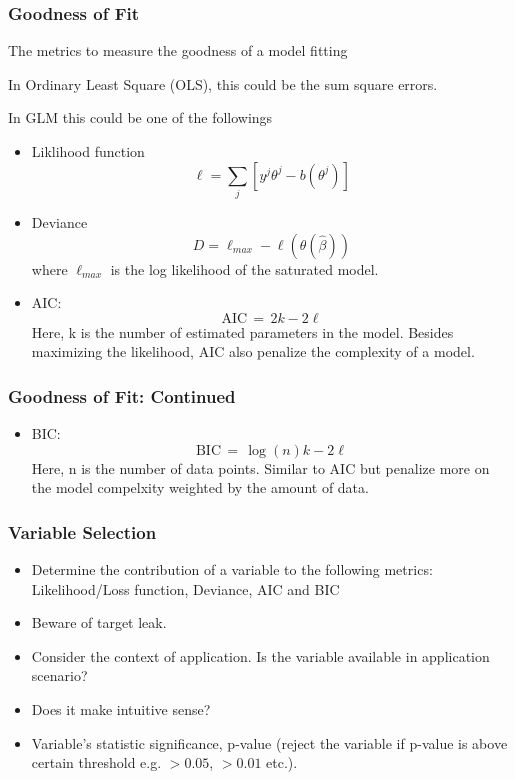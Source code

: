 \documentclass[notheorems, aspectratio=54, tikz,border=10pt,multi]{beamer}
\begin{document}
\begin{frame}
\frametitle{Goodness of Fit}

The metrics to measure the goodness of a model fitting

In Ordinary Least Square (OLS), this could be the sum square errors.

In GLM this could be one of the followings
\begin{itemize}
\item Liklihood function$$\ell=\sum_{j} \left[y^j\theta^j-b(\theta^j)\right]$$

\item Deviance $$D=\ell_{max}-\ell(\theta (\hat{\beta}))$$ where $\ell_{max}$ is the log likelihood of the saturated model.

\item AIC: $${\displaystyle \mathrm {AIC} \,=\,2k-2\ell}$$
Here, k is the number of estimated parameters in the model. Besides maximizing the likelihood, AIC also penalize the complexity of a model.

\end{itemize}
\end{frame}

\begin{frame}
\frametitle{Goodness of Fit: Continued}
\begin{itemize}
\item BIC: $${\displaystyle \mathrm {BIC} \,=\,\log(n)k-2{\ell}}$$
Here, n is the number of data points. Similar to AIC but penalize more on the model compelxity weighted by the amount of data.
\end{itemize}
\end{frame}

\begin{frame}
\frametitle{Variable Selection}
\begin{itemize}
\item Determine the contribution of a variable to the following metrics: Likelihood/Loss function, Deviance, AIC and BIC
\item Beware of target leak.
\item Consider the context of application. Is the variable available in application scenario?
\item Does it make intuitive sense?
\item Variable's statistic significance, p-value (reject the variable if p-value is above certain threshold e.g. $>0.05$, $>0.01$ etc.).
\end{itemize}
\end{frame}
\end{document}
